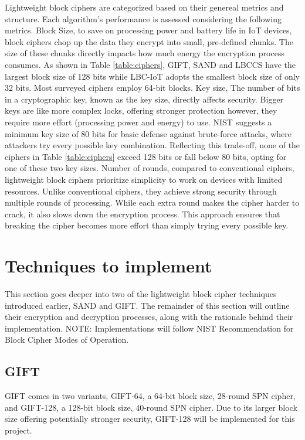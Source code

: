 \documentclass[conference]{IEEEtran}
\begin{document}
Lightweight block ciphers are categorized based on their genereal metrics and structure. Each algorithm's performance is assessed considering the following metrics. 
Block Size, to save on processing power and battery life in IoT devices, block ciphers chop up the data they encrypt into small, pre-defined chunks. The size of these chunks directly impacts how much energy the encryption process consumes. As shown in Table \ref{table:ciphers}, GIFT, SAND and LBCCS have the largest block size of 128 bits while LBC-IoT adopts the smallest block size of only 32 bits. Most surveyed ciphers employ 64-bit blocks.
Key size, The number of bits in a cryptographic key, known as the key size, directly affects security. Bigger keys are like more complex locks, offering stronger protection however, they require more effort (processing power and energy) to use. NIST suggests a minimum key size of 80 bits for basic defense against brute-force attacks, where attackers try every possible key combination\cite{barker2018transitioning}. Reflecting this trade-off, none of the ciphers in Table \ref{table:ciphers} exceed 128 bits or fall below 80 bits, opting for one of these two key sizes.
Number of rounds, compared to conventional ciphers, lightweight block ciphers prioritize simplicity to work on devices with limited resources. Unlike conventional ciphers, they achieve strong security through multiple rounds of processing. While each extra round makes the cipher harder to crack, it also slows down the encryption process. This approach ensures that breaking the cipher becomes more effort than simply trying every possible key.

\section{Techniques to implement} \label{tecnicas}

This section goes deeper into two of the lightweight block cipher techniques introduced earlier, SAND and GIFT. The remainder of this section will outline their encryption and decryption processes, along with the rationale behind their implementation. NOTE: Implementations will follow NIST Recommendation for Block
Cipher Modes of Operation\cite{dworkin2001recommendation}.

\subsection{GIFT}

GIFT comes in two variants, GIFT-64, a 64-bit block size, 28-round SPN cipher, and GIFT-128, a 128-bit block size, 40-round SPN cipher. Due to its larger block size offering potentially stronger security, GIFT-128 will be implemented for this project\cite{yasmin2023modified}.
\end{document}
